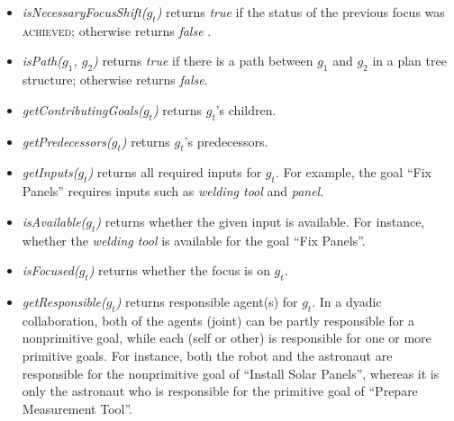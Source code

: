\begin{itemize}[leftmargin=2pt]
  \item \textit{isNecessaryFocusShift($g_t$)} returns \textit{true} if the
  status of the previous focus was \textsc{achieved}; otherwise returns
  \textit{false} \cite{rich:focused-unfocused-users}.
  
  \item \textit{isPath($g_1$, $g_2$)} returns \textit{true} if there is a path
  between $g_1$ and $g_2$ in a plan tree structure; otherwise returns
  \textit{false}.
  
  
  \item \textit{getContributingGoals($g_t$)} returns $g_t$'s children.
  
  \item \textit{getPredecessors($g_t$)} returns $g_t$'s predecessors.
  
  \item \textit{getInputs($g_t$)} returns all required inputs for $g_t$. For
  example, the goal ``Fix Panels'' requires inputs such as \textit{welding tool}
  and \textit{panel}.
  
  \item \textit{isAvailable($g_t$)} returns whether the given input is
  available. For instance, whether the \textit{welding tool} is available for the
  goal ``Fix Panels''.
  
  
  \item \textit{isFocused($g_t$)} returns whether the focus is on $g_t$.
  
  \item \textit{getResponsible($g_t$)} returns responsible agent(s) for $g_t$.
  In a dyadic collaboration, both of the agents (joint) can be partly responsible
  for a nonprimitive goal, while each (self or other) is responsible for one or
  more primitive goals. For instance, both the robot and the astronaut are
  responsible for the nonprimitive goal of ``Install Solar Panels'', whereas it
  is only the astronaut who is responsible for the primitive goal of ``Prepare
  Measurement Tool''.
\end{itemize}

